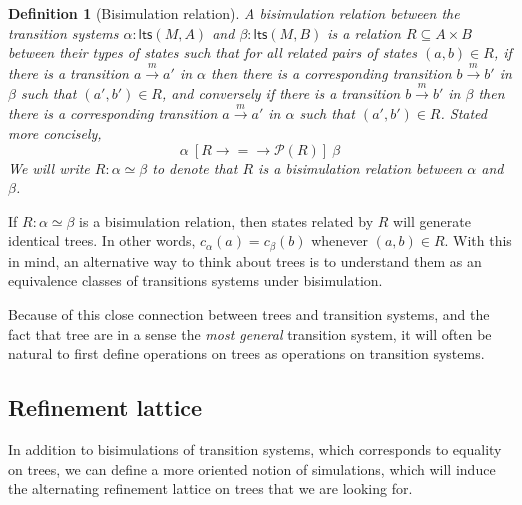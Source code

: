 \documentclass[11pt]{article}
\newcommand{\kw}[1]{{\mathsf{#1}}}
\newtheorem{definition}{Definition}
\begin{document}
\begin{definition}[Bisimulation relation]
A \emph{bisimulation relation} between the transition systems
$\alpha : \kw{lts}(M, A)$ and
$\beta : \kw{lts}(M, B)$
is a relation $R \subseteq A \times B$
between their types of states
such that for all related pairs of states $(a, b) \in R$,
if there is a transition
$a \stackrel{m}{\rightarrow} a'$ in $\alpha$
then there is a corresponding transition
$b \stackrel{m}{\rightarrow} b'$ in $\beta$
such that $(a', b') \in R$,
and conversely if there is a transition
$b \stackrel{m}{\rightarrow} b'$ in $\beta$
then there is a corresponding transition
$a \stackrel{m}{\rightarrow} a'$ in $\alpha$
such that $(a', b') \in R$.
Stated more concisely,
\[
  \alpha \: [R \rightarrow {=} \rightarrow \mathcal{P}(R)] \: \beta
\]
We will write $R : \alpha \simeq \beta$
to denote that $R$ is a bisimulation relation
between $\alpha$ and $\beta$.
\end{definition}

If $R : \alpha \simeq \beta$ is a bisimulation relation,
then states related by $R$ will generate identical trees.
In other words, $c_\alpha(a) = c_\beta(b)$ whenever $(a, b) \in R$.
With this in mind,
an alternative way to think about trees
is to understand them as an equivalence classes
of transitions systems under bisimulation.

Because of this close connection between trees and transition systems,
and the fact that tree are in a sense
the \emph{most general} transition system,
it will often be natural to first define operations on trees
as operations on transition systems.

\subsection{Refinement lattice}

In addition to bisimulations of transition systems,
which corresponds to equality on trees,
we can define a more oriented notion of simulations,
which will induce the alternating refinement lattice on trees
that we are looking for.
\end{document}
